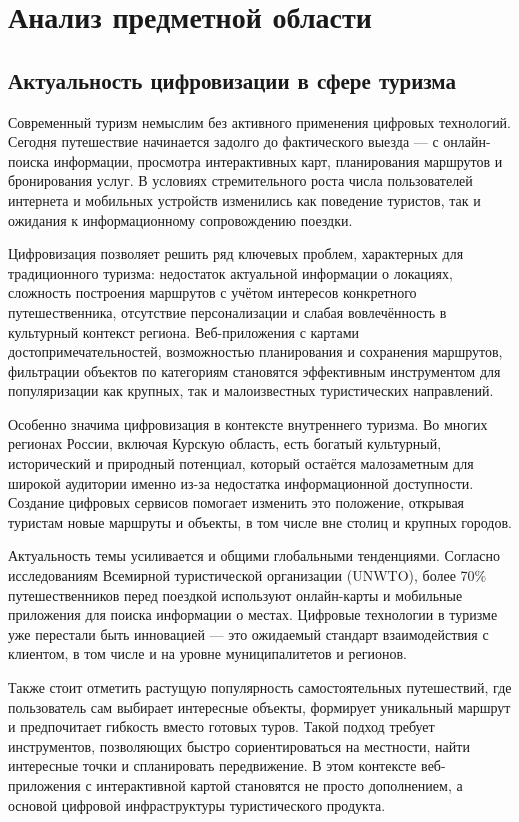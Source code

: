 \section{Анализ предметной области}
\subsection{Актуальность цифровизации в сфере туризма}

Современный туризм немыслим без активного применения цифровых технологий. Сегодня путешествие начинается задолго до фактического выезда — с онлайн-поиска информации, просмотра интерактивных карт, планирования маршрутов и бронирования услуг. В условиях стремительного роста числа пользователей интернета и мобильных устройств изменились как поведение туристов, так и ожидания к информационному сопровождению поездки.

Цифровизация позволяет решить ряд ключевых проблем, характерных для традиционного туризма: недостаток актуальной информации о локациях, сложность построения маршрутов с учётом интересов конкретного путешественника, отсутствие персонализации и слабая вовлечённость в культурный контекст региона. Веб-приложения с картами достопримечательностей, возможностью планирования и сохранения маршрутов, фильтрации объектов по категориям становятся эффективным инструментом для популяризации как крупных, так и малоизвестных туристических направлений.

Особенно значима цифровизация в контексте внутреннего туризма. Во многих регионах России, включая Курскую область, есть богатый культурный, исторический и природный потенциал, который остаётся малозаметным для широкой аудитории именно из-за недостатка информационной доступности. Создание цифровых сервисов помогает изменить это положение, открывая туристам новые маршруты и объекты, в том числе вне столиц и крупных городов.

Актуальность темы усиливается и общими глобальными тенденциями. Согласно исследованиям Всемирной туристической организации (UNWTO), более 70\% путешественников перед поездкой используют онлайн-карты и мобильные приложения для поиска информации о местах. Цифровые технологии в туризме уже перестали быть инновацией — это ожидаемый стандарт взаимодействия с клиентом, в том числе и на уровне муниципалитетов и регионов.

Также стоит отметить растущую популярность самостоятельных путешествий, где пользователь сам выбирает интересные объекты, формирует уникальный маршрут и предпочитает гибкость вместо готовых туров. Такой подход требует инструментов, позволяющих быстро сориентироваться на местности, найти интересные точки и спланировать передвижение. В этом контексте веб-приложения с интерактивной картой становятся не просто дополнением, а основой цифровой инфраструктуры туристического продукта.

